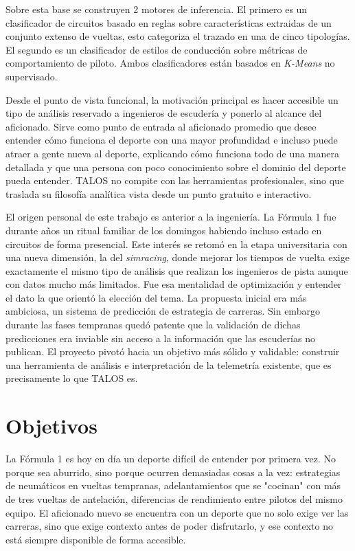 \documentclass[12pt,a4paper,twoside,openright]{book}
\begin{document}
\noindent Sobre esta base se construyen 2 motores de inferencia. El primero es un clasificador de circuitos basado en reglas sobre características extraidas de un conjunto extenso de vueltas, esto categoriza el trazado en una de cinco tipologías.
El segundo es un clasificador de estilos de conducción sobre métricas de comportamiento de piloto. Ambos clasificadores están basados en \textit{K-Means} no supervisado.

\noindent Desde el punto de vista funcional, la motivación principal es hacer accesible un tipo de análisis reservado a ingenieros de escudería y ponerlo al alcance del aficionado. Sirve como punto de entrada
al aficionado promedio que desee entender cómo funciona el deporte con una mayor profundidad e incluso puede atraer a gente nueva al deporte, explicando cómo funciona todo de una manera detallada y que una persona con poco conocimiento sobre el dominio del deporte pueda entender.
TALOS no compite con las herramientas profesionales, sino que traslada su filosofía analítica vista desde un punto gratuito e interactivo.

\noindent El origen personal de este trabajo es anterior a la ingeniería. La Fórmula 1 fue durante años un ritual familiar de los domingos habiendo incluso estado en circuitos de forma presencial. Este interés se retomó en la etapa universitaria con una nueva dimensión, la del \textit{simracing}, donde mejorar los tiempos de vuelta exige
exactamente el mismo tipo de análisis que realizan los ingenieros de pista aunque con datos mucho más limitados.
Fue esa mentalidad de optimización y entender el dato la que orientó la elección del tema. La propuesta inicial era más ambiciosa, un sistema de predicción de estrategia de carreras. Sin embargo durante las fases tempranas quedó patente que la validación de dichas predicciones era inviable sin acceso a la información que las escuderías no publican.
El proyecto pivotó hacia un objetivo más sólido y validable: construir una herramienta de análisis e interpretación de la telemetría existente, que es precisamente lo que TALOS es.

\section{Objetivos}
La Fórmula 1 es hoy en día un deporte difícil de entender por primera vez. No porque sea aburrido, sino porque ocurren demasiadas cosas a la vez: estrategias de neumáticos en vueltas tempranas, adelantamientos que se "cocinan" con más de tres vueltas de antelación, diferencias
de rendimiento entre pilotos del mismo equipo. El aficionado nuevo se encuentra con un deporte que no solo exige ver las carreras, sino que exige contexto antes de poder disfrutarlo, y ese contexto no está siempre disponible de forma accesible.
\end{document}
